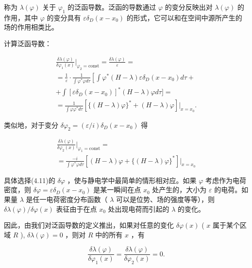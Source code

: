 称为 $\lambda(\varphi)$ 关于 $\varphi_{1}$ 的泛函导数。泛函的导数通过 $\varphi$ 的变分反映出对 $\lambda(\varphi)$ 的作用，其中 $\varphi$ 的变分具有 $\varepsilon\delta_{D}(x-x_{0})$ 的形式，它可以和在空间中源所产生的场的作用相类比。

计算泛函导数：

\begin{equation*}
\begin{array}{l} \frac {\delta \lambda (\varphi)}{\delta \varphi_ {1} (x)} \Bigg | _ {\varphi_ {2} = \text {const}} = \frac {\delta \lambda (\varphi)}{\varepsilon} = \\ = \frac {1}{\varepsilon} \cdot \frac {1}{\int \varphi^ {*} \varphi d \tau} \left[ \int \varphi^ {*} (H - \lambda) \varepsilon \delta_ {D} (x - x _ {0}) d \tau + \right. \\ \left. + \int [ \varepsilon \delta_ {D} (x - x _ {0}) ] ^ {*} (H - \lambda) \varphi d \tau ] = \right. \\ = \frac {1}{\int \varphi \varphi^ {*} d \tau} [ \{(H - \lambda) \varphi \} ^ {*} + (H - \lambda) \varphi ] | _ {x = x _ {0}}. \end{array} \tag{4.13}
\end{equation*}

类似地，对于变分 $\delta\varphi_{2}=(\varepsilon/i)\delta_{D}(x-x_{0})$ 得

\begin{equation*}
\begin{array}{l} \frac {\delta \lambda (\varphi)}{\delta \varphi_ {2} (x)} \Big | _ {\varphi_ {1} = \mathrm{const}} = \\ = \frac {- i}{\int \varphi^ {*} \varphi d \tau} [ (H - \lambda) \varphi + \{(H - \lambda) \varphi \} ^ {*} ] | _ {x = x _ {0}} \end{array}\tag{4.14}
\end{equation*}

具体选择(4.11)的 $\delta\varphi$ ，使与静电学中最简单的情形相对应。如果 $\varphi$ 考虑作为电荷密度，则 $\delta\varphi = \varepsilon\delta_{D}(x - x_{0})$ 是某一瞬间在点 $x_{0}$ 处产生的，大小为 $\varepsilon$ 的电荷。如果量 $\lambda$ 是任一电荷密度分布函数（ $\lambda$ 可以是位势、场的强度等等），则 $\delta\lambda(\varphi)/\delta\varphi(x)$ 表征由于在点 $x_{0}$ 处出现电荷而引起的 $\lambda$ 的变化。

因此，由我们对泛函导数的定义推出，如果对任意的变化 $\delta \varphi(x)$ ( $x$ 属于某个区域 $R$ ), $\delta \lambda(\varphi) = 0$ ，则对 $R$ 中的所有 $x$ ，有

\begin{equation*}
\frac {\delta \lambda (\varphi)}{\delta \varphi_ {1} (x)} = \frac {\delta \lambda (\varphi)}{\delta \varphi_ {2} (x)} = 0.
\end{equation*}

